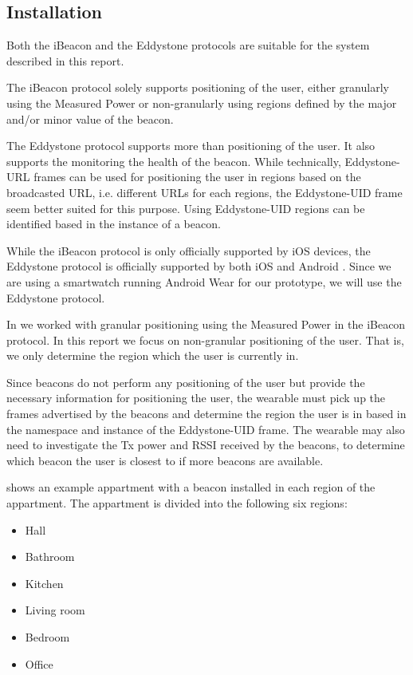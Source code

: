 \subsection{Installation}

Both the iBeacon and the Eddystone protocols are suitable for the system described in this report. 

The iBeacon protocol solely supports positioning of the user, either granularly using the Measured Power or non-granularly using regions defined by the major and/or minor value of the beacon.

The Eddystone protocol supports more than positioning of the user. It also supports the monitoring the health of the beacon. While technically, Eddystone-URL frames can be used for positioning the user in regions based on the broadcasted URL, i.e. different URLs for each regions, the Eddystone-UID frame seem better suited for this purpose. Using Eddystone-UID regions can be identified based in the instance of a beacon.

While the iBeacon protocol is only officially supported by iOS devices, the Eddystone protocol is officially supported by both iOS and Android \cite{estimote:what-is-eddystone}. Since we are using a smartwatch running Android Wear for our prototype, we will use the Eddystone protocol.

In \cite{prespecialisation} we worked with granular positioning using the Measured Power in the iBeacon protocol. In this report we focus on non-granular positioning of the user. That is, we only determine the region which the user is currently in.

Since beacons do not perform any positioning of the user but provide the necessary information for positioning the user, the wearable must pick up the frames advertised by the beacons and determine the region the user is in based in the namespace and instance of the Eddystone-UID frame. The wearable may also need to investigate the Tx power and RSSI received by the beacons, to determine which beacon the user is closest to if more beacons are available.

 shows an example appartment with a beacon installed in each region of the appartment. The appartment is divided into the following six regions:

\begin{itemize}
\item Hall
\item Bathroom
\item Kitchen
\item Living room
\item Bedroom
\item Office
\end{itemize}

